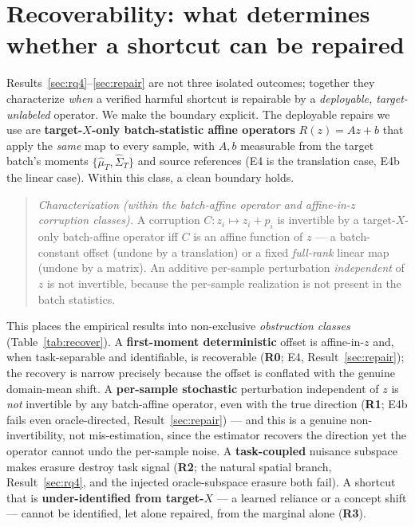 \section{Recoverability: what determines whether a shortcut can be repaired}
\label{sec:recoverability}

Results~\ref{sec:rq4}--\ref{sec:repair} are not three isolated outcomes; together they characterize \emph{when} a
verified harmful shortcut is repairable by a \emph{deployable, target-unlabeled} operator. We make the boundary
explicit. The deployable repairs we use are \textbf{target-$X$-only batch-statistic affine operators} $R(z)=Az+b$
that apply the \emph{same} map to every sample, with $A,b$ measurable from the target batch's moments
$\{\hat\mu_T,\hat\Sigma_T\}$ and source references (E4 is the translation case, E4b the linear case). Within this
class, a clean boundary holds.

\begin{quote}
\emph{Characterization (within the batch-affine operator and affine-in-$z$ corruption classes).} A corruption
$C:z_i\mapsto z_i+p_i$ is invertible by a target-$X$-only batch-affine operator iff $C$ is an affine function of
$z$ --- a batch-constant offset (undone by a translation) or a fixed \emph{full-rank} linear map (undone by a
matrix). An additive per-sample perturbation \emph{independent} of $z$ is not invertible, because the per-sample
realization is not present in the batch statistics.
\end{quote}

This places the empirical results into non-exclusive \emph{obstruction classes} (Table~\ref{tab:recover}). A
\textbf{first-moment deterministic} offset is affine-in-$z$ and, when task-separable and identifiable, is
recoverable (\textbf{R0}; E4, Result~\ref{sec:repair}); the recovery is narrow precisely because the offset is
conflated with the genuine domain-mean shift. A \textbf{per-sample stochastic} perturbation independent of $z$ is
\emph{not} invertible by any batch-affine operator, even with the true direction (\textbf{R1}; E4b fails even
oracle-directed, Result~\ref{sec:repair}) --- and this is a genuine non-invertibility, not mis-estimation, since
the estimator recovers the direction yet the operator cannot undo the per-sample noise. A \textbf{task-coupled}
nuisance subspace makes erasure destroy task signal (\textbf{R2}; the natural spatial branch,
Result~\ref{sec:rq4}, and the injected oracle-subspace erasure both fail). A shortcut that is
\textbf{under-identified from target-$X$} --- a learned reliance or a concept shift --- cannot be identified,
let alone repaired, from the marginal alone (\textbf{R3}).

